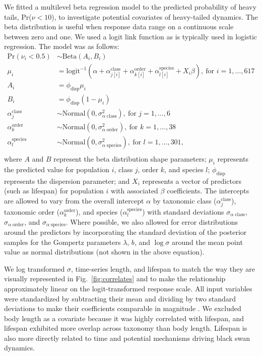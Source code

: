 We fitted a multilevel beta regression model to the predicted probability of
heavy tails, Pr($\nu < 10$), to investigate potential covariates of heavy-tailed
dynamics. The beta distribution is useful when response data range on
a continuous scale between zero and one. We used a logit link function as is
typically used in logistic regression. The model was as follows:
\begin{align*}
\mathrm{Pr}(\nu_i < 0.5) &\sim \mathrm{Beta}(A_i, B_i)\\
\mu_i &= \mathrm{logit}^{-1}(\alpha
  + \alpha^\mathrm{class}_{j[i]}
  + \alpha^\mathrm{order}_{k[i]}
  + \alpha^\mathrm{species}_{l[i]}
  + X_i \beta),
  \: \text{for } i = 1, \dots, 617\\
A_i &= \phi_\mathrm{disp} \mu_i\\
B_i &= \phi_\mathrm{disp} (1 - \mu_i)\\
\alpha^\mathrm{class}_j &\sim
  \mathrm{Normal}(0, \sigma^2_{\alpha \; \mathrm{class}}),
  \: \text{for } j = 1, \dots, 6\\
\alpha^\mathrm{order}_k &\sim
  \mathrm{Normal}(0, \sigma^2_{\alpha \; \mathrm{order}}),
  \: \text{for } k = 1, \dots, 38\\
\alpha^\mathrm{species}_l &\sim
  \mathrm{Normal}(0, \sigma^2_{\alpha \; \mathrm{species}}),
  \: \text{for } l = 1, \dots, 301,\\
\end{align*}
where $A$ and $B$ represent the beta distribution shape parameters; $\mu_i$
represents the predicted value for population $i$, class $j$, order $k$, and
species $l$; $\phi_\mathrm{disp}$ represents the dispersion parameter; and $X_i$
represents a vector of predictors (such as lifespan) for population $i$ with
associated $\beta$ coefficients. The intercepts are allowed to vary from the
overall intercept $\alpha$ by taxonomic class ($\alpha^\mathrm{class}_j$),
taxonomic order ($\alpha^\mathrm{order}_k$), and species
($\alpha^\mathrm{species}_l$) with standard deviations $\sigma_{\alpha \;
  \mathrm{class}}$, $\sigma_{\alpha \; \mathrm{order}}$, and $\sigma_{\alpha \;
  \mathrm{species}}$. Where possible, we also allowed for error distributions
around the predictors by incorporating the standard deviation of the posterior
samples for the Gompertz parameters $\lambda$, $b$, and $\log \sigma$ around the
mean point value as normal distributions (not shown in the above equation).

We log transformed $\sigma$, time-series length, and lifespan to match the way
they are visually represented in Fig.~\ref{fig:correlates} and to make the
relationship approximately linear on the logit-transformed response scale. All
input variables were standardized by subtracting their mean and dividing by two
standard deviations to make their coefficients comparable in magnitude
\citep{gelman2008c}. We excluded body length as a covariate because it was
highly correlated with lifespan, and lifespan exhibited more overlap across
taxonomy than body length. Lifespan is also more directly related to time and
potential mechanisms driving black swan dynamics.


